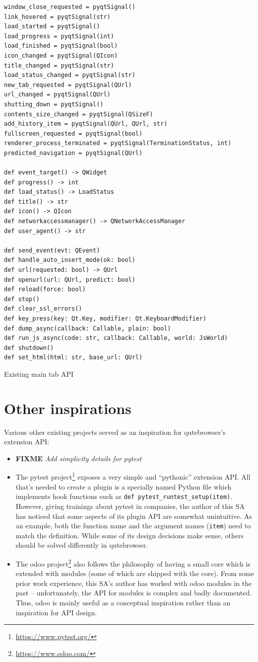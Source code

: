\documentclass[a4paper,parskip=full,DIV=14,BCOR=15mm]{scrreprt}
\newcommand{\py}[1]{\texttt{#1}}
\newcommand{\fixme}[1]{\textbf{FIXME} \emph{#1}}
\begin{document}
\begin{listing}
\begin{verbatim}
window_close_requested = pyqtSignal()
link_hovered = pyqtSignal(str)
load_started = pyqtSignal()
load_progress = pyqtSignal(int)
load_finished = pyqtSignal(bool)
icon_changed = pyqtSignal(QIcon)
title_changed = pyqtSignal(str)
load_status_changed = pyqtSignal(str)
new_tab_requested = pyqtSignal(QUrl)
url_changed = pyqtSignal(QUrl)
shutting_down = pyqtSignal()
contents_size_changed = pyqtSignal(QSizeF)
add_history_item = pyqtSignal(QUrl, QUrl, str)
fullscreen_requested = pyqtSignal(bool)
renderer_process_terminated = pyqtSignal(TerminationStatus, int)
predicted_navigation = pyqtSignal(QUrl)

def event_target() -> QWidget
def progress() -> int
def load_status() -> LoadStatus
def title() -> str
def icon() -> QIcon
def networkaccessmanager() -> QNetworkAccessManager
def user_agent() -> str

def send_event(evt: QEvent)
def handle_auto_insert_mode(ok: bool)
def url(requested: bool) -> QUrl
def openurl(url: QUrl, predict: bool)
def reload(force: bool)
def stop()
def clear_ssl_errors()
def key_press(key: Qt.Key, modifier: Qt.KeyboardModifier)
def dump_async(callback: Callable, plain: bool)
def run_js_async(code: str, callback: Callable, world: JsWorld)
def shutdown()
def set_html(html: str, base_url: QUrl)
\end{verbatim}
  \caption{Existing main tab API}
  \label{lst:tabapi}
\end{listing}

\section{Other inspirations}
Various other existing projects served as an inspiration for qutebrowser's
extension API:

\begin{itemize}
  \item \fixme{Add simplicity details for pytest}
  \item The pytest project\footnote{\url{https://www.pytest.org/}} exposes a
    very simple and ``pythonic'' extension API. All that's needed to create a
    plugin is a specially named Python file which implements hook functions such
    as \py{def pytest_runtest_setup(item)}. However, giving trainings about
    pytest in companies, the author of this SA has noticed that some aspects of
    its plugin API are somewhat unintuitive. As an example, both the function
    name and the argument names (\verb|item|) need to match the definition.
    While some of its design decisions make sense, others should be solved
    differently in qutebrowser.
  \item The odoo project\footnote{\url{https://www.odoo.com/}} also follows the
    philosophy of having a small core which is extended with modules (some of
    which are shipped with the core). From some prior work experience, this SA's
    author has worked with odoo modules in the past -- unfortunately, the API
    for modules is complex and badly documented. Thus, odoo is mainly useful as
    a conceptual inspiration rather than an inspiration for API design.
\end{itemize}
\end{document}
